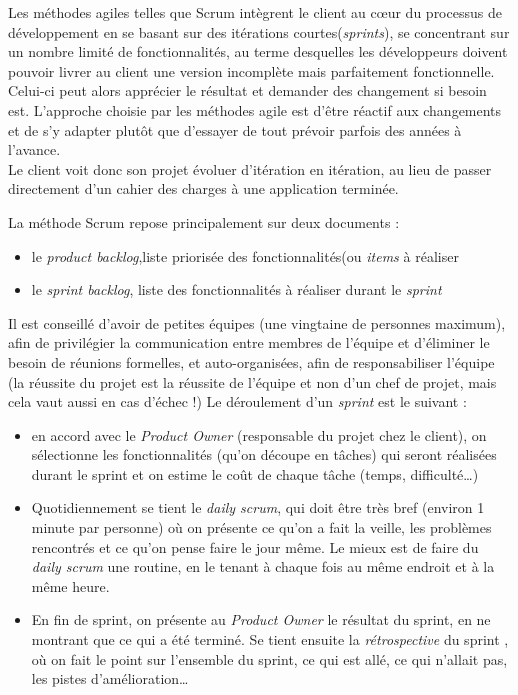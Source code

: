 Les méthodes agiles telles que Scrum intègrent le client au cœur du processus de  développement en se basant sur des itérations courtes(\textit{sprints}), se concentrant sur un nombre limité de fonctionnalités, au terme desquelles les développeurs doivent pouvoir livrer au client une version incomplète mais parfaitement fonctionnelle.
Celui-ci peut alors apprécier le résultat et demander des changement si besoin est. L'approche choisie par les méthodes agile est d'être réactif aux changements et de s'y adapter plutôt que d'essayer de tout prévoir parfois des années à l'avance.\\

 Le client voit donc son projet évoluer d'itération en itération, au lieu de passer directement d'un cahier des charges à une application terminée.
 
 La méthode Scrum repose principalement sur deux documents : 
 \begin{itemize}
 	\item le \textit{product backlog},liste priorisée des fonctionnalités(ou \textit{items} à réaliser
 	\item le \textit{sprint backlog}, liste des fonctionnalités à réaliser durant le \textit{sprint}\\
 \end{itemize}
 
Il est conseillé d'avoir de petites équipes (une vingtaine de personnes maximum), afin de privilégier la communication entre membres de l'équipe et d'éliminer le besoin de réunions formelles, et auto-organisées, afin de responsabiliser l'équipe (la réussite du projet est la réussite de l'équipe et non d'un chef de projet, mais cela vaut aussi en cas d'échec !)
 Le déroulement d'un \textit{sprint} est le suivant :
 \begin{itemize}
 	\item en accord avec le \textit{Product Owner} (responsable du projet chez le client), on sélectionne les fonctionnalités (qu'on découpe en tâches) qui seront réalisées durant le sprint et on estime le \og coût \fg{} de chaque tâche (temps, difficulté\ldots)
 	\item Quotidiennement se tient le \textit{daily scrum}, qui doit être très bref (environ 1 minute par personne) où on présente ce qu'on a fait la veille, les problèmes rencontrés et ce qu'on pense faire le jour même. Le mieux est de faire du \textit{daily scrum} une routine, en le tenant à chaque fois au même endroit et à la même heure.
 	\item En fin de sprint, on présente au \textit{Product Owner} le résultat du sprint, en ne montrant que ce qui a été terminé. Se tient ensuite la \textit{rétrospective} du sprint , où on fait le point sur l'ensemble du sprint, ce qui est allé, ce qui n'allait pas, les pistes d'amélioration\ldots\\
 \end{itemize}

